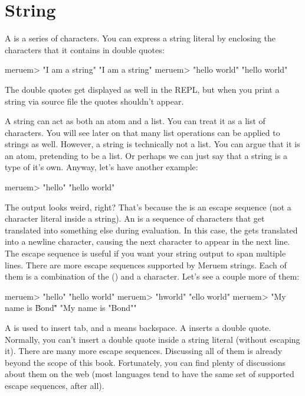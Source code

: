 \section{String}
\label{sec:string}
A  is a series of characters. You can express a string literal by enclosing the characters that it contains in double quotes:

\begin{REPL}
meruem> "I am a string"
"I am a string"
meruem> "hello world"
"hello world"
\end{REPL}

The double quotes get displayed as well in the REPL, but when you print a string via source file the quotes shouldn't appear. 

A string can act as both an atom and a list. You can treat it as a list of characters. You will see later on that many list operations can be applied to strings as well. However, a string is technically not a list. You can argue that it is an atom, pretending to be a list. Or perhaps we can just say that a string is a type of it's own. Anyway, let's have another example:

\begin{REPL}
meruem> "hello\nworld"
"hello
world"
\end{REPL}

The output looks weird, right? That's because the  is an escape sequence (not a character literal inside a string). An  is a sequence of characters that get translated into something else during evaluation. In this case, the  gets translated into a newline character, causing the next character to appear in the next line. The escape sequence  is useful if you want your string output to span multiple lines. There are more escape sequences supported by Meruem strings. Each of them is a combination of the  (\code{\textbackslash}) and a character. Let's see a couple more of them:

\begin{REPL}
meruem> "hello\tworld"
"hello	world"
meruem> "h\bello world"
"ello world"
meruem> "My name is \"Bond\""
"My name is "Bond""
\end{REPL}

A  is used to insert tab, and a  means backspace. A  inserts a double quote. Normally, you can't insert a double quote inside a string literal (without escaping it). There are many more escape sequences. Discussing all of them is already beyond the scope of this book. Fortunately, you can find plenty of discussions about them on the web (most languages tend to have the same set of supported escape sequences, after all). 

